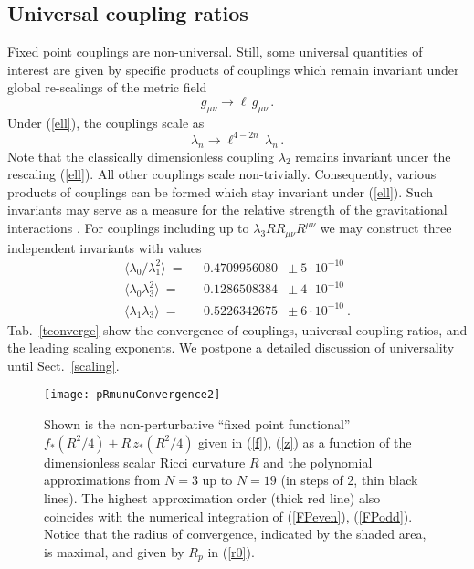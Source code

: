 \documentclass[notitlepage,eqsecnum,bm,amsmath,preprintnumbers,superscriptaddress,nofootinbib,aps,11pt]{revtex4-1}
\def\eq#1{(\ref{#1})}
\def\R{\rho}
\def\R{R}
\begin{document}
\subsection{Universal coupling ratios}
Fixed point couplings are non-universal. Still, some universal quantities of interest are given by specific products of couplings which remain invariant under global re-scalings of the metric field
 \begin{equation}\label{ell}
 g_{\mu\nu}\to \ell\, g_{\mu\nu}\,.
 \end{equation}
 Under \eq{ell}, the couplings scale as
\begin{equation}
\lambda_n\to\ell^{4-2n}\,\lambda_n\,.
\end{equation}
Note that the classically dimensionless coupling $\lambda_2$ remains invariant under the rescaling \eq{ell}. All other couplings scale non-trivially. Consequently, various products of couplings can be formed which stay invariant under \eq{ell}. 
Such invariants may serve as a measure for the relative strength of the gravitational interactions \cite{Kawai:1989yh}.  
For couplings including up to $\lambda_3R R_{\mu\nu}R^{\mu\nu}$ we may construct three independent invariants with values
\begin{equation}\label{lambdaP}
\begin{array}{rcl}
\langle\lambda_0/\lambda_1^2\rangle\ =&\ \ \, 0.4709956080&\pm\ 5\cdot 10^{-10}\\
\langle\lambda_0\lambda_3^2\rangle\ =&\ \ \,0.1286508384&\pm\ 4\cdot 10^{-10}\\
\langle\lambda_1\lambda_3 \rangle\ = &\ \ \,0.5226342675&\pm\ 6\cdot 10^{-10}\ .
\end{array}
\end{equation}
Tab.~\ref{tconverge} show the convergence of couplings, universal coupling ratios, and the leading scaling exponents. We postpone a detailed discussion of universality until Sect.~\ref{scaling}.




\begin{figure*}[t]
\begin{center}
\texttt{[image: pRmunuConvergence2]}
\caption{\label{Numfeff} Shown is the non-perturbative ``fixed point functional''  $f_*(R^2/4)+R\,z_*(R^2/4)$ given in \eq{f}, \eq{z} as a function of the dimensionless scalar Ricci curvature $R$ and the polynomial approximations from $N=3$ up to $N=19$ (in steps of 2, thin black lines). The highest approximation order (thick red line) also coincides with the numerical integration of \eq{FPeven}, \eq{FPodd}. Notice that the radius of convergence, indicated by the shaded area,  is maximal, and given by $\R_p$  in \eq{r0}.}
\end{center}
\end{figure*}
\end{document}
